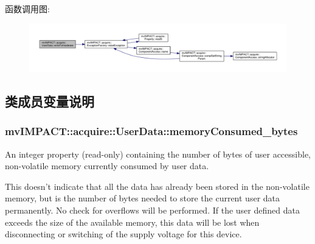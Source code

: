 函数调用图\+:
\nopagebreak
\begin{figure}[H]
\begin{center}
\leavevmode
\includegraphics[width=350pt]{classmv_i_m_p_a_c_t_1_1acquire_1_1_user_data_ae6e2e87a923281c6a821b0f221b968b8_cgraph}
\end{center}
\end{figure}




\subsection{类成员变量说明}
\hypertarget{classmv_i_m_p_a_c_t_1_1acquire_1_1_user_data_a4ea40b43d2ffba2efb6c14bdd6583b59}{
\subsubsection[{memory\+Consumed\+\_\+bytes}]{ mv\+I\+M\+P\+A\+C\+T\+::acquire\+::\+User\+Data\+::memory\+Consumed\+\_\+bytes}}\label{classmv_i_m_p_a_c_t_1_1acquire_1_1_user_data_a4ea40b43d2ffba2efb6c14bdd6583b59}


An integer property {\bfseries }(read-\/only) containing the number of bytes of user accessible, non-\/volatile memory currently consumed by user data. 

This doesn't indicate that all the data has already been stored in the non-\/volatile memory, but is the number of bytes needed to store the current user data permanently. No check for overflows will be performed. If the user defined data exceeds the size of the available memory, this data will be lost when disconnecting or switching of the supply voltage for this device.

